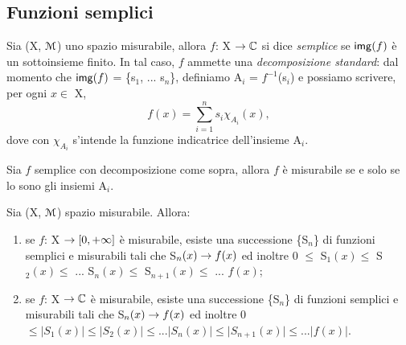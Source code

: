 \documentclass[Completo.tex]{subfiles}
\begin{document}
\subsection{Funzioni semplici}
\begin{Def}
		Sia (X, $\eu[M]$) uno spazio misurabile, allora $f$: X $\ra \bb[C]$ si dice \textit{semplice} se $\sf[img](f)$ è un sottoinsieme finito. In tal caso, $f$ ammette una \textit{decomposizione standard}: dal momento che $\sf[img](f)$ = \{s$_1$, ... s$_n$\}, definiamo A$_i$ = $f^{-1}$(s$_i$) e possiamo scrivere, per ogni $x \in$ X,
		\begin{equation*}
		f(x) = \sum\limits_{i=1}^{n} s_i \chi_{A_i}(x),
		\end{equation*}
		dove con $\chi_{A_i}$ s'intende la funzione indicatrice dell'insieme A$_i$.
\end{Def}
\begin{Prop}
	Sia $f$ semplice con decomposizione come sopra, allora $f$ è misurabile se e solo se lo sono gli insiemi A$_i$.
\end{Prop}
\begin{eTh}
	Sia (X, $\eu[M]$) spazio misurabile. Allora:
	\begin{enumerate}
		\item se $f$: X $\rightarrow [0, +\infty]$ è misurabile, esiste una successione \{S$_n$\} di funzioni semplici e misurabili tali che S$_n(x) \rightarrow f(x)$ ed inoltre 0 $\leq$ S$_1(x) \leq$ S$_2(x) \leq$ ... S$_n(x) \leq$ S$_{n+1}(x) \leq$ ... $f(x)$;
		\item se $f$: X $\ra \bb[C]$ è misurabile, esiste una successione \{S$_n$\} di funzioni semplici e misurabili tali che S$_n(x) \rightarrow f(x)$ ed inoltre 0 $\leq \vert S_1(x) \vert \leq \vert S_2(x) \vert \leq ... \vert S_n(x) \vert \leq \vert S_{n+1}(x) \vert \leq ... \vert f(x) \vert$.
	\end{enumerate}
\end{eTh}
\end{document}
